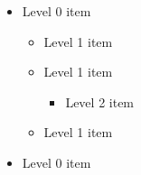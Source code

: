 \begin{itemize}
    \item Level 0 item
    \begin{itemize}
        \item Level 1 item
        \item Level 1 item
        \begin{itemize}
            \item Level 2 item
        \end{itemize}
        \item Level 1 item
    \end{itemize}
    \item Level 0 item
\end{itemize}
